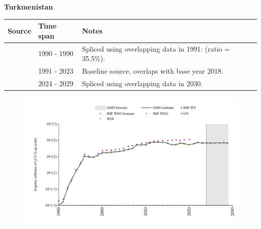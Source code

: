 \documentclass[12pt,a4paper,landscape]{article}
\begin{document}
\begin{adjustbox}{max totalsize={\paperwidth}{\paperheight},center}
\begin{minipage}[t][\textheight][t]{\textwidth}
\vspace*{0.5cm}
{}
\begin{center}
{\Large\bfseries Turkmenistan}
\end{center}
\vspace{0.5cm}
\begin{table}[H]
\centering
\small
\begin{tabular}{|l|l|l|}
\hline
\textbf{Source} & \textbf{Time span} & \textbf{Notes} \\
\hline
\rowcolor{white}\cite{UN}& 1990 - 1990 &Spliced using overlapping data in 1991: (ratio = 35.5\%).\\
\rowcolor{lightgray}\cite{WDI}& 1991 - 2023 &Baseline source, overlaps with base year 2018.\\
\rowcolor{white}\cite{IMF_WEO_forecast}& 2024 - 2029 &Spliced using overlapping data in 2030.\\
\hline
\end{tabular}
\end{table}
\begin{figure}[H]
\centering
\includegraphics[width=\textwidth,height=0.6\textheight,keepaspectratio]{graphs/TKM_exports.pdf}
\end{figure}
\end{minipage}
\end{adjustbox}
\end{document}
